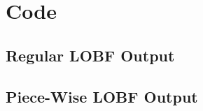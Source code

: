 \documentclass[12 pt]{report}
\begin{document}
\chapter{Code} \label{code}


\section{Regular LOBF Output} \label{regular_lobf_output}


\section{Piece-Wise LOBF Output} \label{piece-wise_lobf_output}
\end{document}
